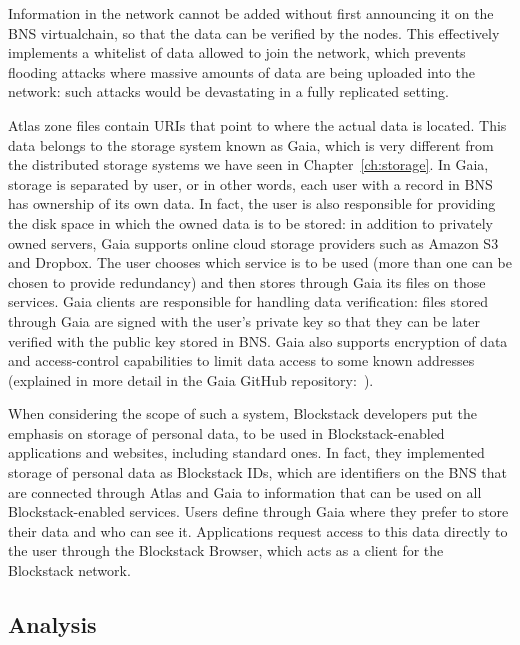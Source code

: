 \documentclass[mscthesis]{usiinfthesis}
\begin{document}
Information in the network cannot be added without first announcing it on the BNS virtualchain, so that the data can be verified by the nodes. This effectively implements a whitelist of data allowed to join the network, which prevents flooding attacks where massive amounts of data are being uploaded into the network: such attacks would be devastating in a fully replicated setting.

Atlas zone files contain URIs that point to where the actual data is located. This data belongs to the storage system known as Gaia, which is very different from the distributed storage systems we have seen in Chapter~\ref{ch:storage}. In Gaia, storage is separated by user, or in other words, each user with a record in BNS has ownership of its own data. In fact, the user is also responsible for providing the disk space in which the owned data is to be stored: in addition to privately owned servers, Gaia supports online cloud storage providers such as Amazon S3 and Dropbox. The user chooses which service is to be used (more than one can be chosen to provide redundancy) and then stores through Gaia its files on those services. Gaia clients are responsible for handling data verification: files stored through Gaia are signed with the user's private key so that they can be later verified with the public key stored in BNS. Gaia also supports encryption of data and access-control capabilities to limit data access to some known addresses (explained in more detail in the Gaia GitHub repository:~\cite{website:gaiaaccesscontrol}).

When considering the scope of such a system, Blockstack developers put the emphasis on storage of personal data, to be used in Blockstack-enabled applications and websites, including standard ones.
In fact, they implemented storage of personal data as Blockstack IDs, which are identifiers on the BNS that are connected through Atlas and Gaia to information that can be used on all Blockstack-enabled services.
Users define through Gaia where they prefer to store their data and who can see it. Applications request access to this data directly to the user through the Blockstack Browser, which acts as a client for the Blockstack network.

\subsection{Analysis}\label{sec:blockstackanalysis}
\end{document}
